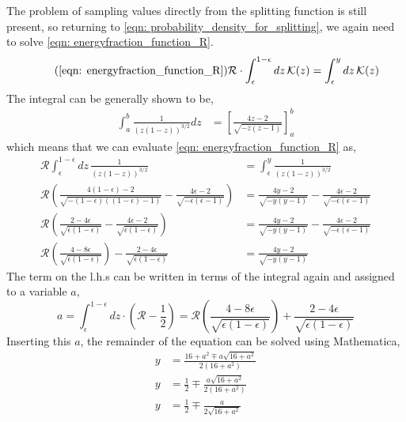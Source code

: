 \documentclass[main.tex]{subfiles}
\begin{document}
The problem of sampling values directly from the splitting function is still present, so returning to \autoref{eqn: probability_density_for_splitting}, we again need to solve \autoref{eqn: energyfraction_function_R}. 
\begin{equation}\tag{\ref{eqn: energyfraction_function_R}}
    \mathcal{R} \cdot \int_\epsilon^{1-\epsilon} dz \, \mathcal{K}(z) = \int_\epsilon^{y}dz \, \mathcal{K}(z)
\end{equation}
The integral can be generally shown to be, 
\begin{align}
    \int_a^b \frac{1}{(z(1-z))^{3/2}}dz &= \left[ \frac{4z-2}{\sqrt{-z(z-1)}} \right]_a^b
\end{align}
which means that we can evaluate \autoref{eqn: energyfraction_function_R} as,
\begin{align}
    \mathcal{R} \int_\epsilon^{1-\epsilon} dz \, \frac{1}{(z(1-z))^{3/2}} &= \int_\epsilon^{y} \frac{1}{(z(1-z))^{3/2}} \nonumber \\
    \mathcal{R} \left(  \frac{4(1-\epsilon)-2}{\sqrt{-(1-\epsilon)((1-\epsilon)-1)}} - \frac{4\epsilon-2}{\sqrt{-\epsilon(\epsilon-1)}} \right) &= \frac{4y-2}{\sqrt{-y(y-1)}} - \frac{4\epsilon-2}{\sqrt{-\epsilon(\epsilon-1)}} \nonumber\\
    \mathcal{R} \left(  \frac{2-4\epsilon}{\sqrt{\epsilon(1-\epsilon)}} - \frac{4\epsilon-2}{\sqrt{\epsilon(1-\epsilon)}} \right) &= \frac{4y-2}{\sqrt{-y(y-1)}} - \frac{4\epsilon-2}{\sqrt{-\epsilon(\epsilon-1)}} \nonumber\\
    \mathcal{R} \left(  \frac{4-8\epsilon}{\sqrt{\epsilon(1-\epsilon)}} \right) - \frac{2-4\epsilon}{\sqrt{\epsilon(1-\epsilon)}} &= \frac{4y-2}{\sqrt{-y(y-1)}} 
\end{align}
The term on the l.h.s can be written in terms of the integral again and assigned to a variable \(a\), 
\begin{equation}
    a = \int_\epsilon^{1-\epsilon} dz \cdot \left(\mathcal{R} - \frac{1}{2} \right) = \mathcal{R} \left(  \frac{4-8\epsilon}{\sqrt{\epsilon(1-\epsilon)}} \right) + \frac{2-4\epsilon}{\sqrt{\epsilon(1-\epsilon)}}
\end{equation}
Inserting this \(a\), the remainder of the equation can be solved using Mathematica,
\begin{align}\label{eqn: medium_gg_sampling}
    y &= \frac{16 + a^2 \mp a \sqrt{16 + a^2}}{2 (16 + a^2)} \nonumber\\
    y &= \frac{1}{2} \mp \frac{a \sqrt{16 + a^2}}{2 (16 + a^2)} \nonumber\\
    y &= \frac{1}{2} \mp \frac{a }{2 \sqrt{16 + a^2}}
\end{align}
\end{document}
